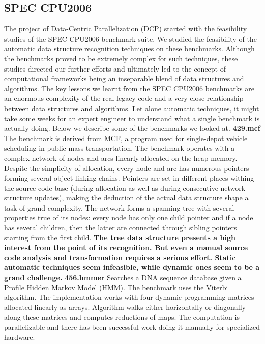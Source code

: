 \subsection{SPEC CPU2006}
\label{background_benchmarks_spec}
\quad The project of Data-Centric Parallelization (DCP) started with the feasibility studies of the SPEC CPU2006 benchmark suite. We studied the feasibility of the automatic data structure recognition techniques on these benchmarks. Although the benchmarks proved to be extremely complex for such techniques, these studies directed our further efforts and ultimately led to the concept of computational frameworks being an inseparable blend of data structures and algorithms. The key lessons we learnt from the SPEC CPU2006 benchmarks are an enormous complexity of the real legacy code and a very close relationship between data structures and algorithms. Let alone automatic techniques, it might take some weeks for an expert engineer to understand what a single benchmark is actually doing. Below we describe some of the benchmarks we looked at.\newline\null
\quad \textbf{429.mcf} \quad The benchmark is derived from MCF, a program used for single-depot vehicle scheduling in public mass transportation. The benchmark operates with a complex network of nodes and arcs linearly allocated on the heap memory. Despite the simplicity of allocation, every node and arc has numerous pointers forming several object linking chains. Pointers are set in different places withing the source code base (during allocation as well as during consecutive network structure updates), making the deduction of the actual data structure shape a task of grand complexity. The network forms a spanning tree with several properties true of its nodes: every node has only one child pointer and if a node has several children, then the latter are connected through sibling pointers starting from the first child.\newline\null
\quad\textbf{The tree data structure presents a high interest from the point of its recognition. But even a manual source code analysis and transformation requires a serious effort. Static automatic techniques seem infeasible, while dynamic ones seem to be a grand challenge.}\newline\null
\quad \textbf{456.hmmer} \quad Searches a DNA sequence database given a Profile Hidden Markov Model (HMM). The benchmark uses the Viterbi algorithm. The implementation works with four dynamic programming matrices allocated linearly as arrays. Algorithm walks either horizontally or diagonally along these matrices and computes reductions of maps. The computation is parallelizable and there has been successful work \cite{Ganesan:2010:AHG:1854776.1854844}\cite{inria} doing it manually for specialized hardware.\newline\null
